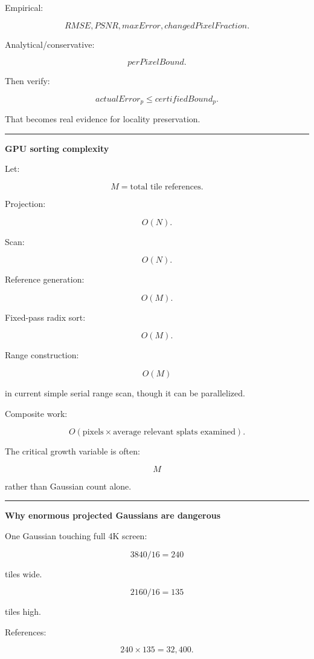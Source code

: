 Empirical:

\[
RMSE,
PSNR,
maxError,
changedPixelFraction.
\]

Analytical/conservative:

\[
perPixelBound.
\]

Then verify:

\[
actualError_p
\le
certifiedBound_p.
\]

That becomes real evidence for locality preservation.

\begin{center}\rule{0.5\linewidth}{0.5pt}\end{center}

\textbf{GPU sorting complexity}

Let:

\[
M
=
\text{total tile references}.
\]

Projection:

\[
O(N).
\]

Scan:

\[
O(N).
\]

Reference generation:

\[
O(M).
\]

Fixed-pass radix sort:

\[
O(M).
\]

Range construction:

\[
O(M)
\]

in current simple serial range scan, though it can be parallelized.

Composite work:

\[
O(
\text{pixels}
\times
\text{average relevant splats examined}
).
\]

The critical growth variable is often:

\[
\boxed{M}
\]

rather than Gaussian count alone.

\begin{center}\rule{0.5\linewidth}{0.5pt}\end{center}

\textbf{Why enormous projected Gaussians are dangerous}

One Gaussian touching full 4K screen:

\[
3840/16=240
\]

tiles wide.

\[
2160/16=135
\]

tiles high.

References:

\[
240\times135
=
32,400.
\]

